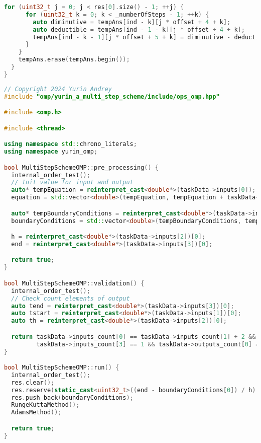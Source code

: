 \documentclass{report}
\begin{document}
\begin{lstlisting}[language=C++,caption=Последовательная версия]
    for (uint32_t j = 0; j < res[0].size() - 1; ++j) {
      for (uint32_t k = 0; k < _numberOfSteps - 1; ++k) {
        auto diminutive = tempAns[ind - k][j * offset + 4 + k];
        auto deductible = tempAns[ind - 1 - k][j * offset + 4 + k];
        tempAns[ind - k - 1][j * offset + 5 + k] = diminutive - deductible;
      }
    }
    tempAns.erase(tempAns.begin());
  }
}
\end{lstlisting}

\newpage

\begin{lstlisting}[language=C++,caption=OpenMP версия]
// Copyright 2024 Yurin Andrey
#include "omp/yurin_a_multi_step_scheme/include/ops_omp.hpp"

#include <omp.h>

#include <thread>

using namespace std::chrono_literals;
using namespace yurin_omp;

bool MultiStepSchemeOMP::pre_processing() {
  internal_order_test();
  // Init value for input and output
  auto* tempEquation = reinterpret_cast<double*>(taskData->inputs[0]);
  equation = std::vector<double>(tempEquation, tempEquation + taskData->inputs_count[0]);

  auto* tempBoundaryConditions = reinterpret_cast<double*>(taskData->inputs[1]);
  boundaryConditions = std::vector<double>(tempBoundaryConditions, tempBoundaryConditions + taskData->inputs_count[1]);

  h = reinterpret_cast<double*>(taskData->inputs[2])[0];
  end = reinterpret_cast<double*>(taskData->inputs[3])[0];

  return true;
}

bool MultiStepSchemeOMP::validation() {
  internal_order_test();
  // Check count elements of output
  auto tend = reinterpret_cast<double*>(taskData->inputs[3])[0];
  auto tstart = reinterpret_cast<double*>(taskData->inputs[1])[0];
  auto th = reinterpret_cast<double*>(taskData->inputs[2])[0];

  return taskData->inputs_count[0] == taskData->inputs_count[1] + 2 && taskData->inputs_count[2] == 1 &&
         taskData->inputs_count[3] == 1 && taskData->outputs_count[0] == (tend - tstart) / th + 1;
}

bool MultiStepSchemeOMP::run() {
  internal_order_test();
  res.clear();
  res.reserve(static_cast<uint32_t>((end - boundaryConditions[0]) / h) + 2);
  res.push_back(boundaryConditions);
  RungeKuttaMethod();
  AdamsMethod();

  return true;
}


\end{lstlisting}
\end{document}
